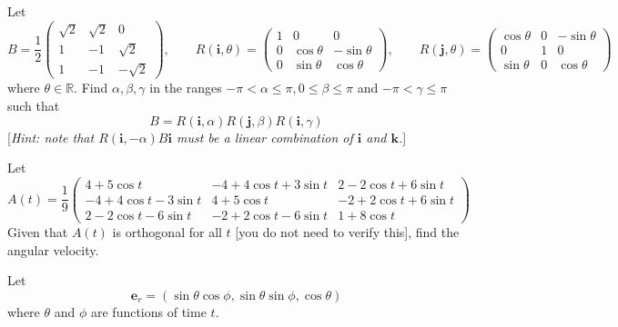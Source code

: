 \documentclass[answers]{exam}
\begin{document}
\begin{questions}
\question%
Let \[
	B=\frac{1}{2}\begin{pmatrix}
		\sqrt{2} & \sqrt{2} & 0 \\
		1 & -1 & \sqrt{2} \\
		1 & -1 & -\sqrt{2}
	\end{pmatrix},\qquad
	R(\mathbf{i}, \theta)=\begin{pmatrix}
		1 & 0 & 0 \\
		0 & \cos \theta & -\sin \theta \\
		0 & \sin \theta & \cos \theta
	\end{pmatrix},\qquad
	R(\mathbf{j}, \theta)=\begin{pmatrix}
		\cos \theta & 0 & -\sin \theta \\
		0 & 1 & 0 \\
		\sin \theta & 0 & \cos \theta
	\end{pmatrix}
\] where $\theta \in \mathbb{R}$. Find $\alpha, \beta, \gamma$ in the ranges $-\pi<\alpha \leqslant \pi, 0 \leqslant \beta \leqslant \pi$ and $-\pi<\gamma \leqslant \pi$ such that \[
	B=R(\mathbf{i}, \alpha) R(\mathbf{j}, \beta) R(\mathbf{i}, \gamma)
\] [\emph{Hint: note that $R(\mathbf{i},-\alpha) B \mathbf{i}$ must be a linear combination of $\mathbf{i}$ and $\mathbf{k}$.}]



\question%
Let \[
	A(t)=\frac{1}{9}\begin{pmatrix}
		4+5 \cos t & -4+4 \cos t+3 \sin t & 2-2 \cos t+6 \sin t \\
		-4+4 \cos t-3 \sin t & 4+5 \cos t & -2+2 \cos t+6 \sin t \\
		2-2 \cos t-6 \sin t & -2+2 \cos t-6 \sin t & 1+8 \cos t
	\end{pmatrix}
\] Given that $A(t)$ is orthogonal for all $t$ [you do not need to verify this], find the angular velocity.



\question%
Let \[
	\mathbf{e}_{r}=(\sin \theta \cos \phi, \sin \theta \sin \phi, \cos \theta)
\] where $\theta$ and $\phi$ are functions of time $t$.
\end{questions}
\end{document}
